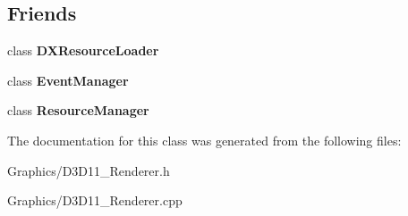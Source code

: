 \subsection*{Friends}
\begin{DoxyCompactItemize}
\item 
\mbox{\label{classDXRenderer_a871268c492209c5a9db9dc2db99f4d04}} 
class {\bfseries D\+X\+Resource\+Loader}
\item 
\mbox{\label{classDXRenderer_aba45a46c615e2683daffdae82e2d3b8f}} 
class {\bfseries Event\+Manager}
\item 
\mbox{\label{classDXRenderer_a54c1252abc87a78a301e6b6984470408}} 
class {\bfseries Resource\+Manager}
\end{DoxyCompactItemize}


The documentation for this class was generated from the following files\+:\begin{DoxyCompactItemize}
\item 
Graphics/D3\+D11\+\_\+\+Renderer.\+h\item 
Graphics/D3\+D11\+\_\+\+Renderer.\+cpp\end{DoxyCompactItemize}
